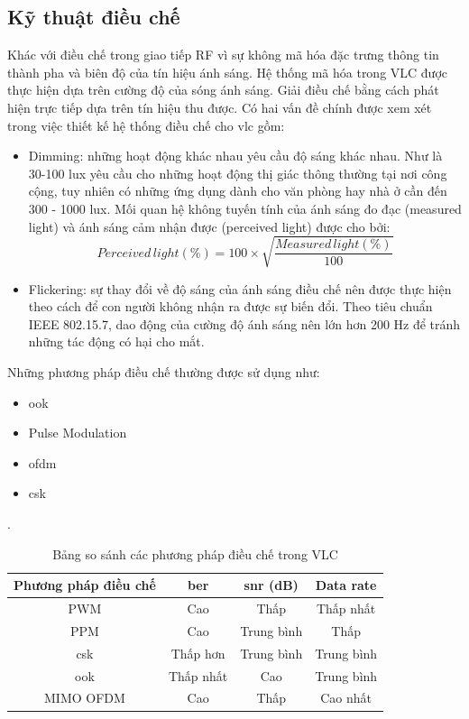 \subsection{Kỹ thuật điều chế \cite{VLC-application}}
Khác với điều chế trong giao tiếp RF vì sự không mã hóa đặc trưng thông tin thành pha và biên độ của tín hiệu ánh sáng. Hệ thống mã hóa trong VLC được thực hiện dựa trên cường độ của sóng ánh sáng. Giải điều chế bằng cách phát hiện trực tiếp dựa trên tín hiệu thu được. Có hai vấn đề chính được xem xét trong việc thiết kế hệ thống điều chế cho \ac{vlc} gồm:
\begin{itemize}
	\item Dimming: những hoạt động khác nhau yêu cầu độ sáng khác nhau. Như là 30-100 lux yêu cầu cho những hoạt động thị giác thông thường tại nơi công cộng, tuy nhiên có những ứng dụng dành cho văn phòng hay nhà ở cần đến 300 - 1000 lux. Mối quan hệ không tuyến tính của ánh sáng đo đạc (measured light) và ánh sáng cảm nhận được (perceived light) được cho bởi:
\begin{equation}
Perceived \, light (\%) = 100 \times \sqrt{\frac{Measured \, light (\%)}{100}}
\end{equation}
	\item Flickering: sự thay đổi về độ sáng của ánh sáng điều chế nên được thực hiện theo cách để con người không nhận ra được sự biến đổi. Theo tiêu chuẩn IEEE 802.15.7, dao động của cường độ ánh sáng nên lớn hơn 200 Hz để tránh những tác động có hại cho mắt.
\end{itemize}

Những phương pháp điều chế thường được sử dụng như:
\begin{itemize}
\item \ac{ook}
\item Pulse Modulation
\item \ac{ofdm}
\item \ac{csk}
\end{itemize}
\begin{table}[H]
	\caption{Bảng so sánh các phương pháp điều chế trong VLC}.
	\begin{center}
	\small
		\begin{tabular}{|c|c|c|c|}
			\hline
			Phương pháp điều chế & \ac{ber} & \ac{snr} (dB) & Data rate\\
			\hline
    			PWM
			&Cao			
			&Thấp
			&Thấp nhất\\
			\hline
    			PPM
			&Cao			
			&Trung bình
			&Thấp\\
			\hline
    			\ac{csk}
			&Thấp hơn			
			&Trung bình
			&Trung bình\\
			\hline
			\ac{ook}
			&Thấp nhất			
			&Cao
			&Trung bình\\
			\hline
			MIMO OFDM
			&Cao			
			&Thấp
			&Cao nhất\\
			\hline
		\end{tabular}
		\label{tab: so-sanh-mod}
	\end{center}
\end{table}

